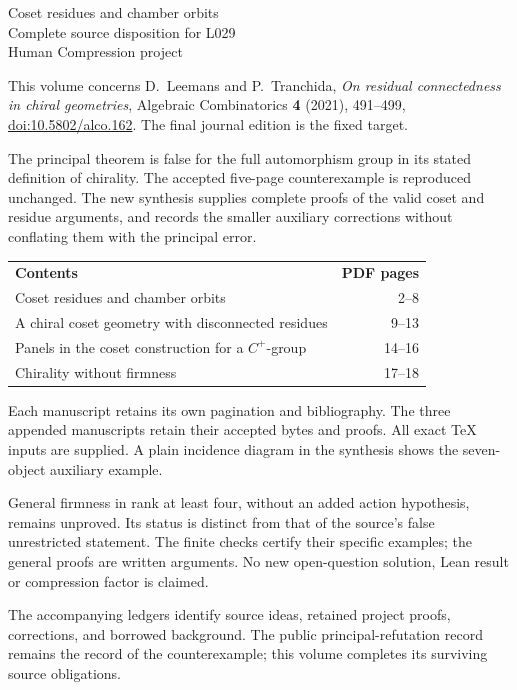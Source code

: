 \documentclass[11pt]{article}
\begin{document}
\pagestyle{empty}
\thispagestyle{empty}
\begin{center}
{\LARGE Coset residues and chamber orbits}\\[12pt]
{\large Complete source disposition for L029}\\[8pt]
Human Compression project
\end{center}
\bigskip
This volume concerns D.~Leemans and P.~Tranchida,
\emph{On residual connectedness in chiral geometries},
Algebraic Combinatorics \textbf{4} (2021), 491--499,
\href{https://doi.org/10.5802/alco.162}{doi:10.5802/alco.162}.
The final journal edition is the fixed target.

The principal theorem is false for the full automorphism group in its
stated definition of chirality. The accepted five-page counterexample
is reproduced unchanged. The new synthesis supplies complete proofs of
the valid coset and residue arguments, and records the smaller auxiliary
corrections without conflating them with the principal error.

\bigskip
\begin{tabular}{p{.74\linewidth}r}
\textbf{Contents}&\textbf{PDF pages}\\[5pt]
Coset residues and chamber orbits&2--8\\[5pt]
A chiral coset geometry with disconnected residues&9--13\\[5pt]
Panels in the coset construction for a $C^+$-group&14--16\\[5pt]
Chirality without firmness&17--18
\end{tabular}
\bigskip

Each manuscript retains its own pagination and bibliography. The three
appended manuscripts retain their accepted bytes and proofs. All exact
TeX inputs are supplied. A plain incidence diagram in the synthesis
shows the seven-object auxiliary example.

General firmness in rank at least four, without an added action
hypothesis, remains unproved. Its status is distinct from that of the
source's false unrestricted statement. The finite checks certify their
specific examples; the general proofs are written arguments. No new
open-question solution, Lean result or compression factor is claimed.

The accompanying ledgers identify source ideas, retained project proofs,
corrections, and borrowed background.
The public principal-refutation record remains the record of the
counterexample; this volume completes its surviving source obligations.
\clearpage




\end{document}
